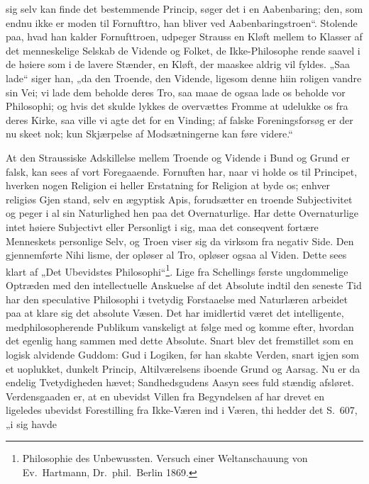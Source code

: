 \documentclass[12pt,a4paper]{article}
\newcommand{\opage}[1]{\marginnote{\footnotesize\textit{[#1]}}}
\begin{document}
sig selv kan finde det bestemmende Princip, søger det i en
Aabenbaring; den, som endnu ikke er moden til Fornufttro, han
bliver ved Aabenbaringstroen“. Stolende paa, hvad han kalder
Fornufttroen, udpeger Strauss en Kløft mellem to Klasser af det
menneskelige Selskab de Vidende og Folket, de Ikke-Philosophe\-%
rende saavel i de høiere som i de lavere Stænder, en Kløft, der
maaskee aldrig vil fyldes. „Saa lade“ siger han, „da den Troende,
den Vidende, ligesom denne hiin roligen vandre sin Vei; vi lade
dem beholde deres Tro, saa maae de ogsaa lade os beholde vor
Philosophi; og hvis det skulde lykkes de overvættes Fromme at
udelukke os fra deres Kirke, saa ville vi agte det for en Vinding;
af falske Foreningsforsøg er der nu skeet nok; kun Skjærpelse af
Modsætningerne kan føre videre.“

At den Straussiske Adskillelse mellem Troende og Vidende i
Bund og Grund er falsk, kan sees af vort Foregaaende. Fornuften
har, naar vi holde os til Principet, hverken nogen Religion ei
heller Erstatning for Religion at byde os; enhver religiøs Gjen\-%
stand, selv en ægyptisk Apis, forudsætter en troende Subjectivitet
og peger i al sin Naturlighed hen paa det Overnaturlige. Har
dette Overnaturlige intet høiere Subjectivt eller Personligt i sig,
maa det conseqvent fortære Menneskets personlige Selv, og Troen
viser sig da virksom fra negativ Side. Den gjennemførte Nihi\-%
lisme, der opløser al Tro, opløser ogsaa al Viden. Dette sees
klart af „Det Ubevidstes Philosophi“\footnote{Philosophie des Unbewussten. Versuch einer Weltanschauung von
Ev.\ Hartmann, Dr.\ phil.\ Berlin 1869.}. %
Lige fra Schellings første
\opage{48}ungdommelige Optræden med den intellectuelle Anskuelse af det
Absolute indtil den seneste Tid har den speculative Philosophi i
tvetydig Forstaaelse med Naturlæren arbeidet paa at klare sig
det absolute Væsen. Det har imidlertid været det intelligente,
medphilosopherende Publikum vanskeligt at følge med og komme
efter, hvordan det egenlig hang sammen med dette Absolute.
Snart blev det fremstillet som en logisk alvidende Guddom: Gud
i Logiken, før han skabte Verden, snart igjen som et uoplukket,
dunkelt Princip, Altilværelsens iboende Grund og Aarsag. Nu er
da endelig Tvetydigheden hævet; Sandhedsgudens Aasyn sees fuld\-%
stændig afsløret. Verdensgaaden er, at en ubevidst Villen fra
Begyndelsen af har drevet en ligeledes ubevidst Forestilling fra
Ikke-Væren ind i Væren, thi hedder det S.\ 607, „i sig havde
\end{document}
